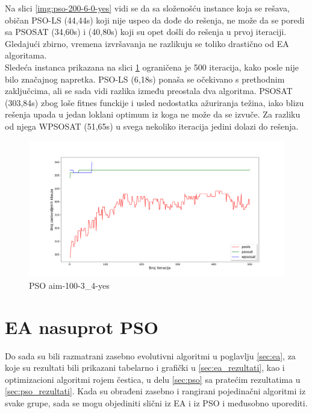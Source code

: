 \documentclass[a4paper]{article}
\begin{document}
Na slici \ref{img:pso-200-6-0-yes} vidi se da sa složenošću instance koja se rešava,
običan PSO-LS (44,44s) koji nije uspeo da dođe do rešenja,
ne može da se poredi sa PSOSAT (34,60s) i (40,80s) koji su 
opet došli do rešenja u prvoj iteraciji. Gledajući zbirno, vremena izvršavanja ne razlikuju
se toliko drastično od EA algoritama. \\

Sledeća instanca prikazana na slici \ref{img:pso-100-3-4-yes} ograničena je 500 iteracija,
kako posle nije bilo značajnog napretka. PSO-LS (6,18s) ponaša se očekivano s prethodnim
zaključcima, ali se sada vidi razlika između preostala dva algoritma. 
PSOSAT (303,84s) zbog loše fitnes funckije i usled nedostatka ažuriranja težina,
iako blizu rešenja upada u jedan loklani optimum iz koga ne može da se izvuče. 
Za razliku od njega WPSOSAT (51,65s) u svega nekoliko iteracija jedini dolazi do rešenja.

\begin{figure}[h!]
\centering
\includegraphics[width=\textwidth]{pso-aim-100-3_4-yes.png}
\caption{PSO aim-100-3\_4-yes}\label{img:pso-100-3-4-yes}
\end{figure}

\section{EA nasuprot PSO}
\label{EAvsPSO}
Do sada su bili razmatrani zasebno evolutivni algoritmi u poglavlju \ref{sec:ea}, za 
koje su rezultati bili prikazani tabelarno i grafički u \ref{sec:ea_rezultati}, kao i
optimizacioni algoritmi rojem čestica, u delu \ref{sec:pso} sa pratećim rezultatima u 
\ref{sec:pso_rezultati}. Kada su obrađeni zasebno i rangirani pojedinačni
algoritmi iz svake grupe, sada se mogu objediniti slični iz EA i iz PSO i međusobno 
uporediti.\\
\end{document}
